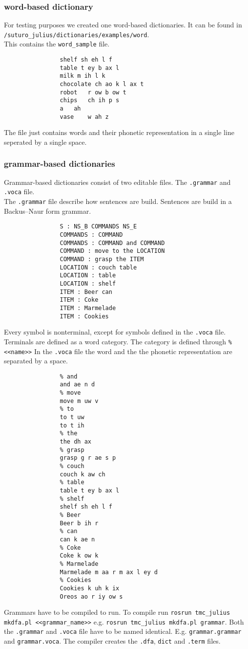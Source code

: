 \documentclass[main.tex]{subfiles}
\begin{document}
		\subsubsection{word-based dictionary}
			For testing purposes we created one word-based dictionaries. It can be found in \lstinline|/suturo_julius/dictionaries/examples/word|.\\
			This contains the \texttt{word\_sample} file.\\
			\begin{lstlisting}
				shelf sh eh l f
				table t ey b ax l
				milk m ih l k
				chocolate ch ao k l ax t
				robot	r ow b ow t
				chips	ch ih p s
				a	ah
				vase	w ah z\end{lstlisting}
			The file just contains words and their phonetic representation in a single line seperated by a single space.
			
		\subsubsection{grammar-based dictionaries}
			Grammar-based dictionaries consist of two editable files. The \texttt{.grammar} and \texttt{.voca} file.\\
			The \texttt{.grammar} file describe how sentences are build. Sentences are build in a Backus–Naur form grammar.\\
			\begin{lstlisting}
				S : NS_B COMMANDS NS_E
				COMMANDS : COMMAND
				COMMANDS : COMMAND and COMMAND
				COMMAND : move to the LOCATION
				COMMAND : grasp the ITEM
				LOCATION : couch table
				LOCATION : table
				LOCATION : shelf
				ITEM : Beer can
				ITEM : Coke
				ITEM : Marmelade
				ITEM : Cookies
			\end{lstlisting}
			Every symbol is nonterminal, except for symbols defined in the \texttt{.voca} file. Terminals are defined as a word category. The category is defined through \newline \lstinline{% <<name>>}
			In the \texttt{.voca} file the word and the the phonetic representation are separated by a space.
			\begin{lstlisting}
				% and
				and ae n d
				% move
				move m uw v
				% to
				to t uw
				to t ih
				% the
				the dh ax
				% grasp
				grasp g r ae s p
				% couch
				couch k aw ch
				% table
				table t ey b ax l
				% shelf
				shelf sh eh l f
				% Beer
				Beer b ih r
				% can
				can k ae n
				% Coke
				Coke k ow k
				% Marmelade
				Marmelade m aa r m ax l ey d
				% Cookies
				Cookies k uh k ix
				Oreos ao r iy ow s
			\end{lstlisting}
		Grammars have to be compiled to run. To compile run \texttt{rosrun tmc\_julius mkdfa.pl <<grammar\_name>>} e.g. \texttt{rosrun tmc\_julius mkdfa.pl grammar}. Both the \texttt{.grammar} and \texttt{.voca} file have to be named identical. E.g. \texttt{grammar.grammar} and \texttt{grammar.voca}. The compiler creates the \texttt{.dfa}, \texttt{dict} and \texttt{.term} files.	
		
\end{document}

